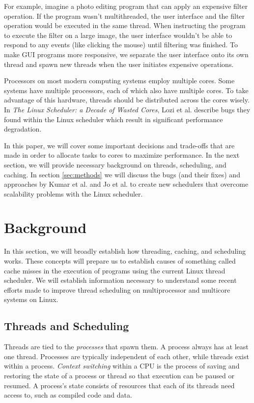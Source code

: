 \documentclass{sig-alternate}
\begin{document}
For example, imagine a photo editing program that can apply an expensive filter operation. If the program wasn't multithreaded, the user interface and the filter operation would be executed in the same thread. When instructing the program to execute the filter on a large image, the user interface wouldn't be able to respond to any events (like clicking the mouse) until filtering was finished. To make GUI programs more responsive, we separate the user interface onto its own thread and spawn new threads when the user initiates expensive operations.

Processors on most modern computing systems employ multiple cores. Some systems have multiple processors, each of which also have multiple cores. To take advantage of this hardware, threads should be distributed across the cores wisely.
In \emph{The Linux Scheduler: a Decade of Wasted Cores}, Lozi et al. describe bugs they found within the Linux scheduler which result in significant performance degradation. 

In this paper, we will cover some important decisions and trade-offs that are made in order to allocate tasks to cores to maximize performance. In the next section, we will provide necessary background on threads, scheduling, and caching. In section \ref{sec:methods} we will discuss the bugs (and their fixes) and approaches by Kumar et al. and Jo et al. to create new schedulers that overcome scalability problems with the Linux scheduler.
\section{Background}
\label{sec:bg}

In this section, we will broadly establish how threading, caching, and scheduling works. These concepts will prepare us to establish causes of something called cache misses in the execution of programs using the current Linux thread scheduler. We will establish information necessary to understand some recent efforts made to improve thread scheduling on multiprocessor and multicore systems on Linux.

\subsection{Threads and Scheduling}
\label{sec:threads}

Threads are tied to the \emph{processes} that spawn them. A process always has at least one thread. Processes are typically independent of each other, while threads exist within a process. \emph{Context switching} within a CPU is the process of saving and restoring the state of a process or thread so that execution can be paused or resumed. A process's state consists of resources that each of its threads need access to, such as compiled code and data.
\end{document}

